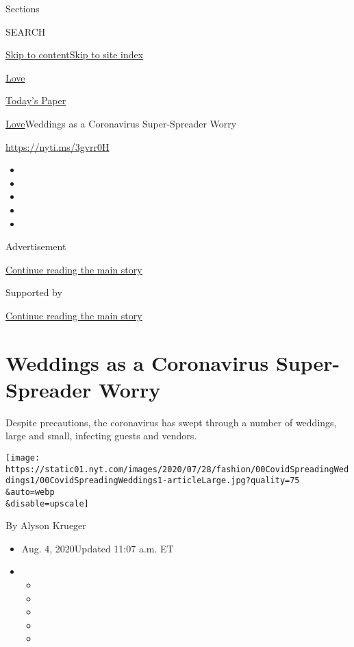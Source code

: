 Sections

SEARCH

\protect\hyperlink{site-content}{Skip to
content}\protect\hyperlink{site-index}{Skip to site index}

\href{https://www.nytimes.com/section/fashion/weddings}{Love}

\href{https://myaccount.nytimes.com/auth/login?response_type=cookie\&client_id=vi}{}

\href{https://www.nytimes.com/section/todayspaper}{Today's Paper}

\href{/section/fashion/weddings}{Love}\textbar{}Weddings as a
Coronavirus Super-Spreader Worry

\url{https://nyti.ms/3gvrr0H}

\begin{itemize}
\item
\item
\item
\item
\item
\end{itemize}

Advertisement

\protect\hyperlink{after-top}{Continue reading the main story}

Supported by

\protect\hyperlink{after-sponsor}{Continue reading the main story}

\hypertarget{weddings-as-a-coronavirus-super-spreader-worry}{%
\section{Weddings as a Coronavirus Super-Spreader
Worry}\label{weddings-as-a-coronavirus-super-spreader-worry}}

Despite precautions, the coronavirus has swept through a number of
weddings, large and small, infecting guests and vendors.

\texttt{[image: https://static01.nyt.com/images/2020/07/28/fashion/00CovidSpreadingWeddings1/00CovidSpreadingWeddings1-articleLarge.jpg?quality=75\\\&auto=webp\\\&disable=upscale]}

By Alyson Krueger

\begin{itemize}
\item
  Aug. 4, 2020Updated 11:07 a.m. ET
\item
  \begin{itemize}
  \item
  \item
  \item
  \item
  \item
  \end{itemize}
\end{itemize}

